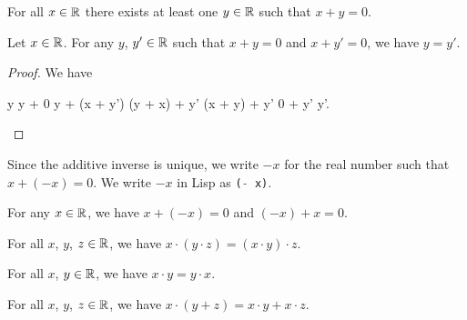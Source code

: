 \begin{axiom}
For all $x\in\mathbb{R}$ there exists at least one $y\in\mathbb{R}$ such that $x + y = 0$.
\end{axiom}

\begin{theorem}
Let $x\in\mathbb{R}$. For any $y$, $y'\in\mathbb{R}$ such that $x + y = 0$ and $x + y' = 0$,
we have $y = y'$. 
\end{theorem}

\begin{proof}
We have
\begin{calculation}
  y
y + 0
y + (x + y')
(y + x) + y'
(x + y) + y'
0 + y'
y'.\qedhere
\end{calculation}
\end{proof}

\begin{remark}
Since the additive inverse is unique, we write $-x$ for the real number
such that $x + (-x) = 0$. We write $-x$ in Lisp as \lstinline[language=lisp]{(- x)}.
\end{remark}

\begin{corollary}\label{cor:elementary-algebra:add-inverse}
For any $x\in\mathbb{R}$, we have $x + (-x) = 0$ and $(-x) + x = 0$.
\end{corollary}

\begin{axiom}
For all $x$, $y$, $z\in\mathbb{R}$, we have $x \cdot (y \cdot z) = (x \cdot y) \cdot z$.
\end{axiom}

\begin{axiom}\label{axiom:elementary-algebra:times-commutativity}
For all $x$, $y\in\mathbb{R}$, we have $x \cdot y = y \cdot x$.
\end{axiom}

\begin{axiom}\label{axiom:elementary-algebra:times-distributes-over-add}
For all $x$, $y$, $z\in\mathbb{R}$, we have $x\cdot(y + z) = x\cdot y + x\cdot z$.
\end{axiom}

